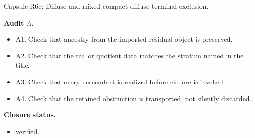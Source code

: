 \documentclass[11pt]{amsart}
\newcommand{\capsulefield}[1]{\par\smallskip\noindent\textbf{#1.}\ }
\begin{document}
\begin{proofcapsule}{Capsule R6c: Diffuse and mixed compact-diffuse terminal exclusion.}
  \capsulefield{Audit \(A\)}
  \begin{itemize}[leftmargin=1.8em]
  \item A1. Check that ancestry from the imported residual object is preserved.
  \item A2. Check that the tail or quotient data matches the stratum named in the title.
  \item A3. Check that every descendant is realized before closure is invoked.
  \item A4. Check that the retained obstruction is transported, not silently discarded.
  \end{itemize}
  \capsulefield{Closure status}
  \begin{itemize}[leftmargin=1.8em]
  \item verified.
  \end{itemize}
\end{proofcapsule}
\end{document}
